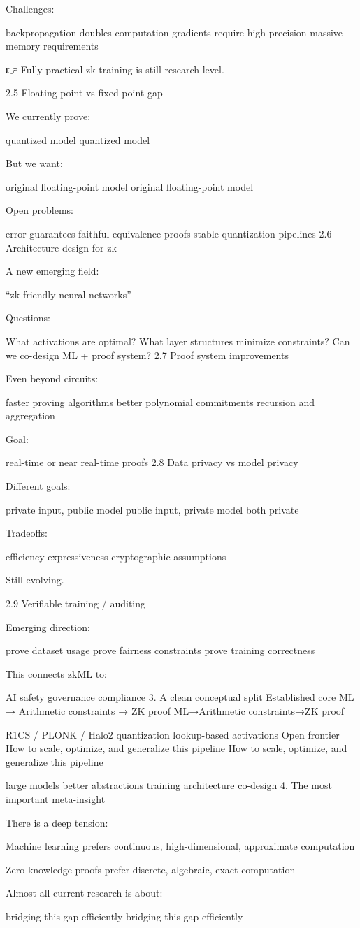 Challenges:

backpropagation doubles computation
gradients require high precision
massive memory requirements

👉 Fully practical zk training is still research-level.

2.5 Floating-point vs fixed-point gap

We currently prove:

quantized model
quantized model

But we want:

original floating-point model
original floating-point model

Open problems:

error guarantees
faithful equivalence proofs
stable quantization pipelines
2.6 Architecture design for zk

A new emerging field:

“zk-friendly neural networks”

Questions:

What activations are optimal?
What layer structures minimize constraints?
Can we co-design ML + proof system?
2.7 Proof system improvements

Even beyond circuits:

faster proving algorithms
better polynomial commitments
recursion and aggregation

Goal:

real-time or near real-time proofs
2.8 Data privacy vs model privacy

Different goals:

private input, public model
public input, private model
both private

Tradeoffs:

efficiency
expressiveness
cryptographic assumptions

Still evolving.

2.9 Verifiable training / auditing

Emerging direction:

prove dataset usage
prove fairness constraints
prove training correctness

This connects zkML to:

AI safety
governance
compliance
3. A clean conceptual split
Established core
ML
→
Arithmetic constraints
→
ZK proof
ML→Arithmetic constraints→ZK proof
	​

R1CS / PLONK / Halo2
quantization
lookup-based activations
Open frontier
How to scale, optimize, and generalize this pipeline
How to scale, optimize, and generalize this pipeline
	​

large models
better abstractions
training
architecture co-design
4. The most important meta-insight

There is a deep tension:

Machine learning prefers continuous, high-dimensional, approximate computation

Zero-knowledge proofs prefer discrete, algebraic, exact computation

Almost all current research is about:

bridging this gap efficiently
bridging this gap efficiently